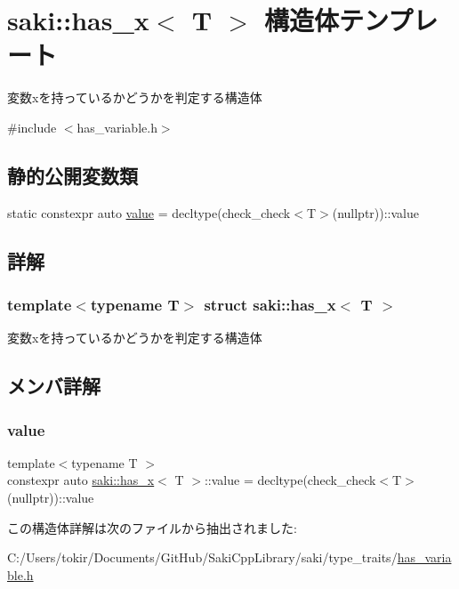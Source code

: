 \hypertarget{structsaki_1_1has__x}{}\section{saki\+:\+:has\+\_\+x$<$ T $>$ 構造体テンプレート}
\label{structsaki_1_1has__x}


変数xを持っているかどうかを判定する構造体  




{\ttfamily \#include $<$has\+\_\+variable.\+h$>$}

\subsection*{静的公開変数類}
\begin{DoxyCompactItemize}
\item 
static constexpr auto \mbox{\hyperlink{structsaki_1_1has__x_aa3b89fa1981c7d31e7ec0c70ea01b451}{value}} = decltype(check\+\_\+check$<$T$>$(nullptr))\+::value
\end{DoxyCompactItemize}


\subsection{詳解}
\subsubsection*{template$<$typename T$>$\newline
struct saki\+::has\+\_\+x$<$ T $>$}

変数xを持っているかどうかを判定する構造体 

\subsection{メンバ詳解}
\mbox{\label{structsaki_1_1has__x_aa3b89fa1981c7d31e7ec0c70ea01b451}} 
\subsubsection{\texorpdfstring{value}{value}}
{\footnotesize\ttfamily template$<$typename T $>$ \\
constexpr auto \mbox{\hyperlink{structsaki_1_1has__x}{saki\+::has\+\_\+x}}$<$ T $>$\+::value = decltype(check\+\_\+check$<$T$>$(nullptr))\+::value\hspace{0.3cm}{\ttfamily [static]}}



この構造体詳解は次のファイルから抽出されました\+:\begin{DoxyCompactItemize}
\item 
C\+:/\+Users/tokir/\+Documents/\+Git\+Hub/\+Saki\+Cpp\+Library/saki/type\+\_\+traits/\mbox{\hyperlink{has__variable_8h}{has\+\_\+variable.\+h}}\end{DoxyCompactItemize}
